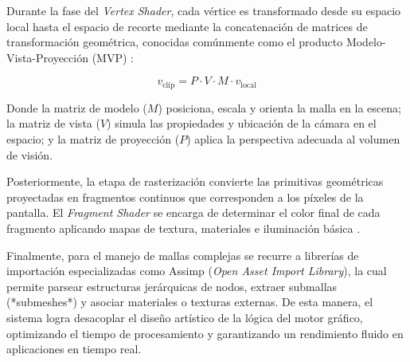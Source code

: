 Durante la fase del \textit{Vertex Shader}, cada vértice es transformado desde su espacio local hasta el espacio de recorte mediante la concatenación de matrices de transformación geométrica, conocidas comúnmente como el producto Modelo-Vista-Proyección (MVP) \cite{lengyel_mathematics}:

\begin{equation}
v_{\text{clip}} = P \cdot V \cdot M \cdot v_{\text{local}}
\end{equation}

Donde la matriz de modelo ($M$) posiciona, escala y orienta la malla en la escena; la matriz de vista ($V$) simula las propiedades y ubicación de la cámara en el espacio; y la matriz de proyección ($P$) aplica la perspectiva adecuada al volumen de visión.

Posteriormente, la etapa de rasterización convierte las primitivas geométricas proyectadas en fragmentos continuos que corresponden a los píxeles de la pantalla. El \textit{Fragment Shader} se encarga de determinar el color final de cada fragmento aplicando mapas de textura, materiales e iluminación básica \cite{akeley_realtime}.

Finalmente, para el manejo de mallas complejas se recurre a librerías de importación especializadas como Assimp (\textit{Open Asset Import Library}), la cual permite parsear estructuras jerárquicas de nodos, extraer submallas (*submeshes*) y asociar materiales o texturas externas. De esta manera, el sistema logra desacoplar el diseño artístico de la lógica del motor gráfico, optimizando el tiempo de procesamiento y garantizando un rendimiento fluido en aplicaciones en tiempo real.

